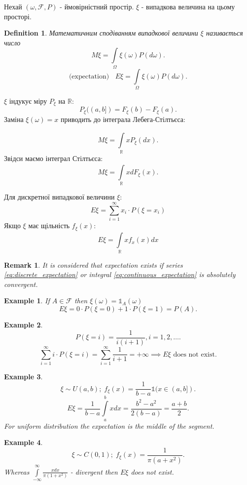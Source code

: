 \documentclass[12pt,letterpaper]{report}
\newtheorem*{example}{Example}
\newtheorem*{remark}{Remark}
\newtheorem{definition}{Definition}
\begin{document}
Нехай $(\omega, \mathcal{F}, P)$ - ймовірністний простір. $\xi$ - випадкова величина на цьому просторі.

\begin{definition}
    Математичним сподіванням випадкової величини $\xi$ називається число
    \[
        M\xi = \int\limits_{\Omega} \xi(\omega) P(d\omega)
    .\] 
    \[
        \text{(expectation) } \;\; E \xi = \int\limits_{\Omega} \xi(\omega) P(d\omega)
    .\] 
\end{definition}

$\xi$ індукує міру $P_{\xi}$ на $\mathbb{R}$:
\[
    P_{\xi} ((a,b]) = F_{\xi}(b) - F_{\xi}(a)
.\] 
Заміна $\xi(\omega) = x$ приводить до інтеграла Лебега-Стілтьєса:

\[
    M\xi = \int\limits_{\mathbb{R}}^{} x P_{\xi}(dx)
.\]
Звідси маємо інтеграл Стілтьєса: 
\[
    M\xi = \int\limits_{\mathbb{R}}^{} x dF_{\xi}(x)
.\] 

Для дискретної випадкової величини $\xi$:
\begin{equation} \label{eq:discrete_expectation}
    E\xi = \sum_{i=1}^{\infty} x_{i} \cdot P(\xi = x_i)
\end{equation}
Якщо $\xi$ має щільність $f_{\xi}(x)$:
\begin{equation} \label{eq:continuous_expectation}
    E\xi = \int\limits_{\mathbb{R}}^{}x f_{x} (x) dx
\end{equation}

\begin{remark}
    It is considered that expectation exists if series \eqref{eq:discrete_expectation} or integral \eqref{eq:continuous_expectation} is absolutely convergent.
\end{remark}

\begin{example}
    If $A \in \mathcal{F} $ then $\xi(\omega) = \mathds{1}_{A}(\omega)$
\[
    E\xi = 0 \cdot P(\xi=0) + 1 \cdot P(\xi=1) = P(A)
.\] 
\end{example}
\begin{example}
    \[
        P(\xi = i) = \frac{1}{i (i+1)}, i=1, 2, \dots
    .\] 
    \[
        \sum_{i=1}^{\infty} i \cdot P(\xi=i) = \sum_{i=1}^{\infty} \frac{1}{i+1} = +\infty \implies
        E\xi \text{ does not exist}
    .\] 
\end{example}

\begin{example}
   \[
       \xi \sim U(a, b); \; f_{\xi}(x) = \frac{1}{b-a} \mathds{1}(x\in(a,b])
   .\] 
   \[
       E\xi = \frac{1}{b-a} \int\limits_{a}^{b}x dx = \frac{b^2 - a^2}{2(b-a)} = \frac{a+b}{2}
   .\] 
   For uniform distribution the expectation is the middle of the segment.
\end{example}
\begin{example}
    \[
        \xi \sim C(0,1); \; f_{\xi}(x) = \frac{1}{\pi (a+x^2)}
    .\] 
    Whereas $\int\limits_{-\infty}^{\infty}\frac{xdx}{\pi (1+x^2)}$ - divergent then $E\xi$ does not exist.
\end{example}
\end{document}
